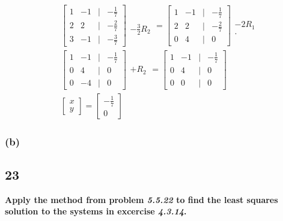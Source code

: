 \documentclass[10pt,letterpaper]{article}
\begin{document}
\begin{align*}
& \begin{bmatrix}
1 & -1 & | & -\frac{1}{7} \\ 
2 & 2 & | & - \frac{2}{7} \\
3 & -1 & | & -\frac{3}{7}
\end{bmatrix} \begin{array}{c}
\\ \\ -\frac{3}{2} R_2
\end{array} = \begin{bmatrix}
1 & -1 & | & -\frac{1}{7} \\ 
2 & 2 & | & - \frac{2}{7} \\
0 & 4 & | & 0
\end{bmatrix} \begin{array}{c}
\\ -2 R_1 \\ .
\end{array} \\ 
& \begin{bmatrix}
1 & -1 & | & -\frac{1}{7} \\ 
0 & 4 & | & 0 \\
0 & -4 & | & 0
\end{bmatrix} \begin{array}{c}
+ R_2
\end{array} = \begin{bmatrix}
1 & -1 & | & -\frac{1}{7} \\ 
0 & 4 & | & 0 \\
0 & 0 & | & 0
\end{bmatrix} \\ 
& \boxed{\begin{bmatrix}
x \\ y
\end{bmatrix} = \begin{bmatrix}
-\frac{1}{7} \\ 0
\end{bmatrix}}
\end{align*}
	\subsubsection*{(b)} 
	\subsection*{23} \textbf{Apply the method from problem \textit{5.5.22} to find the least squares solution to the systems in excercise \textit{4.3.14}. }
\end{document}
